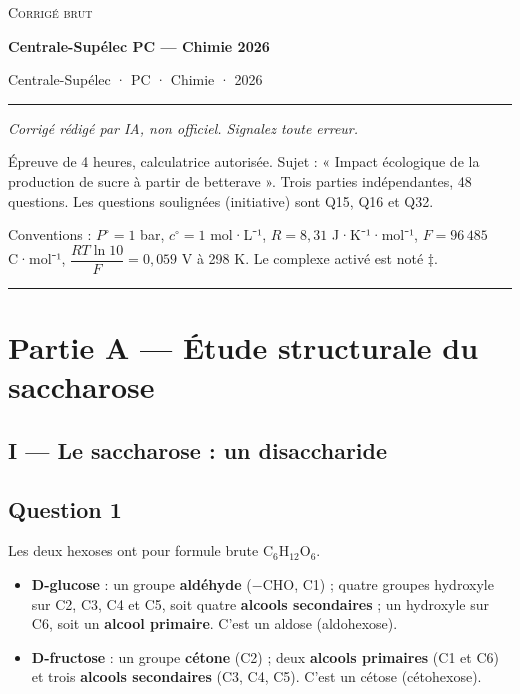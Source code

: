 \documentclass[11pt,a4paper]{article}
\providecommand{\tightlist}{\setlength{\itemsep}{0pt}\setlength{\parskip}{0pt}}
\begin{document}
\thispagestyle{plain}
\begin{center}
  {\small\scshape Corrigé brut}\par\smallskip
  {\LARGE\bfseries Centrale-Supélec PC — Chimie 2026\par}\medskip
  {\large Centrale-Supélec · PC · Chimie · 2026\par}
\end{center}
\vspace{2pt}\hrule\vspace{8pt}

\emph{Corrigé rédigé par IA, non officiel. Signalez toute erreur.}

Épreuve de 4 heures, calculatrice autorisée. Sujet : « Impact écologique de la production de sucre à partir de betterave ». Trois parties indépendantes, 48 questions. Les questions soulignées (initiative) sont Q15, Q16 et Q32.

Conventions : \(P^\circ=1\) bar, \(c^\circ=1\) mol·L⁻¹, \(R=8{,}31\) J·K⁻¹·mol⁻¹, \(F=96\,485\) C·mol⁻¹, \(\dfrac{RT\ln 10}{F}=0{,}059\) V à 298 K. Le complexe activé est noté \(\ddagger\).

\begin{center}\rule{0.5\linewidth}{0.5pt}\end{center}

\hypertarget{partie-a-uxe9tude-structurale-du-saccharose}{%
\section{Partie A --- Étude structurale du saccharose}\label{partie-a-uxe9tude-structurale-du-saccharose}}

\hypertarget{i-le-saccharose-un-disaccharide}{%
\subsection{I --- Le saccharose : un disaccharide}\label{i-le-saccharose-un-disaccharide}}

\hypertarget{question-1}{%
\subsection{Question 1}\label{question-1}}

Les deux hexoses ont pour formule brute \(\mathrm{C_6H_{12}O_6}\).

\begin{itemize}
\tightlist
\item
  \textbf{D-glucose} : un groupe \textbf{aldéhyde} (\(-\mathrm{CHO}\), C1) ; quatre groupes hydroxyle sur C2, C3, C4 et C5, soit quatre \textbf{alcools secondaires} ; un hydroxyle sur C6, soit un \textbf{alcool primaire}. C'est un aldose (aldohexose).
\item
  \textbf{D-fructose} : un groupe \textbf{cétone} (C2) ; deux \textbf{alcools primaires} (C1 et C6) et trois \textbf{alcools secondaires} (C3, C4, C5). C'est un cétose (cétohexose).
\end{itemize}
\end{document}
